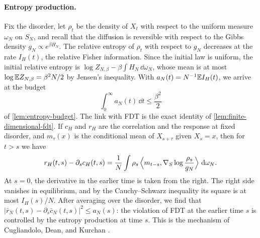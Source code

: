 \paragraph{Entropy production.}
Fix the disorder, let $\rho_t$ be the density of $X_t$ with respect to the uniform measure $\omega_N$ on $S_N$, and recall that the diffusion is reversible with respect to the Gibbs density $g_N\propto e^{\beta H_N}$. The relative entropy of $\rho_t$ with respect to $g_N$ decreases at the rate $I_H(t)$, the relative Fisher information. Since the initial law is uniform, the initial relative entropy is $\log Z_{N,\beta}-\beta\int H_N\,\dd\omega_N$, whose mean is at most $\log\mathbb E Z_{N,\beta}=\beta^2N/2$ by Jensen's inequality. With $a_N(t)=N^{-1}\mathbb E I_H(t)$, we arrive at the budget
\begin{equation}\label{eq:overview-budget}
 \int_0^\infty a_N(t)\,\dd t\le\frac{\beta^2}2
\end{equation}
of \cref{lem:entropy-budget}. The link with FDT is the exact identity of \cref{lem:finite-dimensional-fdt}. If $c_H$ and $r_H$ are the correlation and the response at fixed disorder, and $m_\tau(x)$ is the conditional mean of $X_{s+\tau}$ given $X_s=x$, then for $t>s$ we have
\[
 r_H(t,s)-\partial_sc_H(t,s)
 =\frac1N\int\rho_s\,\Bigl\langle m_{t-s},\nabla_S\log\frac{\rho_s}{g_N}\Bigr\rangle\,\mathop{}\!\mathrm d\omega_N .
\]
At $s=0$, the derivative in the earlier time is taken from the right. The right side vanishes in equilibrium, and by the Cauchy--Schwarz inequality its square is at most $I_H(s)/N$. After averaging over the disorder, we find that $|\bar r_N(t,s)-\partial_s\bar c_N(t,s)|^2\le a_N(s)$: the violation of FDT at the earlier time $s$ is controlled by the entropy production at time $s$. This is the mechanism of Cugliandolo, Dean, and Kurchan \cite[arXiv version~2, equations~(12)--(13), p.~3, and~(18), p.~4]{cdk1997}.

